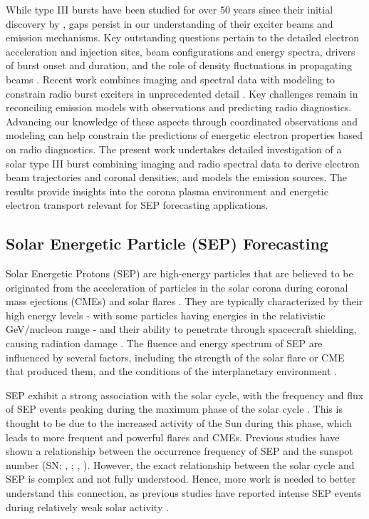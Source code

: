 While type III bursts have been studied for over 50 years since their initial discovery by \citet{wild_1950a, wild_1950b, wild_1950c}, gaps persist in our understanding of their exciter beams and emission mechanisms. Key outstanding questions pertain to the detailed electron acceleration and injection sites, beam configurations and energy spectra, drivers of burst onset and duration, and the role of density fluctuations in propagating beams \citep{reid_2018a, reid_2018b, li_2012a}. Recent work combines imaging and spectral data with modeling to constrain radio burst exciters in unprecedented detail \citep{chen_2013, kontar_2017}. Key challenges remain in reconciling emission models with observations and predicting radio diagnostics. Advancing our knowledge of these aspects through coordinated observations and modeling can help constrain the predictions of energetic electron properties based on radio diagnostics. The present work undertakes detailed investigation of a solar type III burst combining imaging and radio spectral data to derive electron beam trajectories and coronal densities, and models the emission sources. The results provide insights into the corona plasma environment and energetic electron transport relevant for SEP forecasting applications.

\subsection{Solar Energetic Particle (SEP) Forecasting}
Solar Energetic Protons (SEP) are high-energy particles that are believed to be originated from the acceleration of particles in the solar corona during coronal mass ejections (CMEs) and solar flares \citep{aschwanden_2002, klein_2017, lin_2005, lin_2011, kahler_2017}. They are typically characterized by their high energy levels - with some particles having energies in the relativistic GeV/nucleon range - and their ability to penetrate through spacecraft shielding, causing radiation damage \citep{reames_2013, desai_2016}. The fluence and energy spectrum of SEP are influenced by several factors, including the strength of the solar flare or CME that produced them, and the conditions of the interplanetary environment \citep{kahler_1984, kahler_1987, debrunner_1988, miteva_2013, trottet_2015, dierckxsens_2015, le_2017, gopalswamy_2017}.

SEP exhibit a strong association with the solar cycle, with the frequency and flux of SEP events peaking during the maximum phase of the solar cycle \citep{reames_2013}. This is thought to be due to the increased activity of the Sun during this phase, which leads to more frequent and powerful flares and CMEs. Previous studies have shown a relationship between the occurrence frequency of SEP and the sunspot number (SN; \citeauthor{nymmik_2007}, \citeyear{nymmik_2007}; \citeauthor{richardson_2016}, \citeyear{richardson_2016}). However, the exact relationship between the solar cycle and SEP is complex and not fully understood. Hence, more work is needed to better understand this connection, as previous studies have reported intense SEP events during relatively weak solar activity \citep{cohen_2018, ramstad_2018}.

